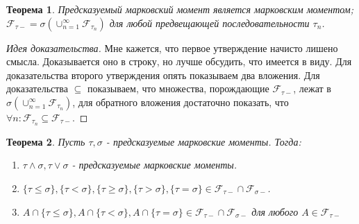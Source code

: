 \documentclass[16pt]{article}
\newtheorem{theorem}{Теорема}[section]
\theoremstyle{definition}
\begin{document}
\begin{theorem}
Предсказуемый марковский момент является марковским моментом; $\mathcal{F}_{\tau-} = \sigma(\cup_{n = 1}^\infty \mathcal{F}_{\tau_n})$ для любой предвещающей последовательности $\tau_n$.
\end{theorem}
\begin{proof}[Идея доказательства]
Мне кажется, что первое утверждение начисто лишено смысла. Доказывается оно в строку, но лучше обсудить, что имеется в виду. \newline Для доказательства второго утверждения опять показываем два вложения. Для доказательства $\subseteq$ показываем, что множества, порождающие $\mathcal{F}_{\tau-}$, лежат в $\sigma(\cup_{n = 1}^\infty \mathcal{F}_{\tau_n})$, для обратного вложения достаточно показать, что $\forall n: \mathcal{F}_{\tau_n} \subseteq \mathcal{F}_{\tau-}$.
\end{proof}
\begin{theorem}
Пусть $\tau, \sigma$ - предсказуемые марковские моменты. Тогда:
\begin{enumerate}
    \item $\tau \wedge \sigma, \tau \vee \sigma$ - предсказуемые марковские моменты.
    \item $\{\tau \le \sigma\}, \{\tau < \sigma\}, \{\tau \ge \sigma\}, \{\tau > \sigma\}, \{\tau = \sigma\} \in \mathcal{F}_{\tau-}\cap\mathcal{F}_{\sigma-}$.
    \item $A \cap \{\tau \le \sigma\}, A \cap \{\tau < \sigma\}, A \cap \{\tau = \sigma\} \in \mathcal{F}_{\tau-}\cap\mathcal{F}_{\sigma-}$ для любого $A \in \mathcal{F}_{\tau-}$
\end{enumerate}
\end{theorem}
\end{document}
